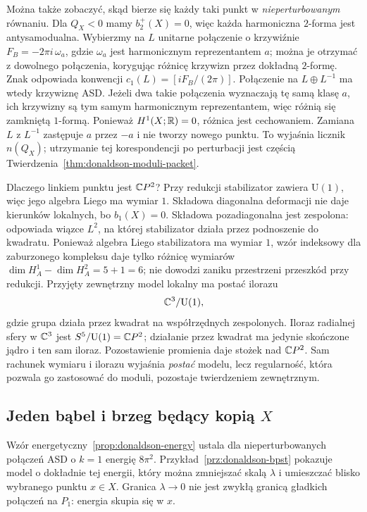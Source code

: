 Można także zobaczyć, skąd bierze się każdy taki
punkt w \emph{nieperturbowanym} równaniu. Dla
$Q_X<0$ mamy $b_2^+(X)=0$, więc każda harmoniczna
$2$-forma jest antysamodualna. Wybierzmy na $L$
unitarne połączenie o krzywiźnie
$F_B=-2\pi i\,\omega_a$, gdzie $\omega_a$ jest
harmonicznym reprezentantem $a$; można je otrzymać
z dowolnego połączenia, korygując różnicę krzywizn
przez dokładną $2$-formę. Znak odpowiada konwencji
$c_1(L)=[iF_B/(2\pi)]$. Połączenie na
$L\oplus L^{-1}$ ma wtedy krzywiznę ASD.
Jeżeli dwa takie połączenia wyznaczają tę samą klasę
$a$, ich krzywizny są tym samym harmonicznym
reprezentantem, więc różnią się zamkniętą
$1$-formą. Ponieważ $H^1(X;\mathbb{R})=0$, różnica jest
cechowaniem. Zamiana $L$ z $L^{-1}$ zastępuje
$a$ przez $-a$ i nie tworzy nowego punktu.
To wyjaśnia licznik $n(Q_X)$; utrzymanie tej
korespondencji po perturbacji jest częścią
Twierdzenia~\ref{thm:donaldson-moduli-packet}.

Dlaczego linkiem punktu jest $\mathbb{C} P^2$?
Przy redukcji stabilizator zawiera $\mathrm{U}(1)$,
więc jego algebra Liego ma wymiar $1$.
Składowa diagonalna deformacji nie daje kierunków
lokalnych, bo $b_1(X)=0$.
Składowa pozadiagonalna jest zespolona: odpowiada
wiązce $L^2$, na której stabilizator działa przez
podnoszenie do kwadratu. Ponieważ algebra Liego
stabilizatora ma wymiar $1$, wzór indeksowy dla
zaburzonego kompleksu daje tylko różnicę wymiarów
$\dim H_A^1-\dim H_A^2=5+1=6$; nie dowodzi
zaniku przestrzeni przeszkód przy redukcji.
Przyjęty zewnętrzny model lokalny ma postać ilorazu
\[
 \mathbb{C}^3/\mathrm{U}(1),
\]
gdzie grupa działa przez kwadrat na współrzędnych
zespolonych.
Iloraz radialnej sfery w $\mathbb{C}^3$ jest
$S^5/\mathrm{U}(1)=\mathbb{C} P^2$; działanie przez
kwadrat ma jedynie skończone jądro i ten sam iloraz.
Pozostawienie promienia daje stożek nad $\mathbb{C} P^2$.
Sam rachunek wymiaru i ilorazu wyjaśnia \emph{postać}
modelu, lecz regularność, która pozwala go zastosować
do moduli, pozostaje twierdzeniem zewnętrznym.

\subsection*{Jeden bąbel i brzeg będący kopią $X$}

Wzór energetyczny~\ref{prop:donaldson-energy}
ustala dla nieperturbowanych połączeń ASD o $k=1$
energię $8\pi^2$. Przykład~\ref{prz:donaldson-bpst}
pokazuje model o dokładnie tej energii, który można
zmniejszać skalą $\lambda$ i umieszczać blisko
wybranego punktu $x\in X$. Granica $\lambda\to0$
nie jest zwykłą granicą gładkich połączeń na $P_1$:
energia skupia się w $x$.

